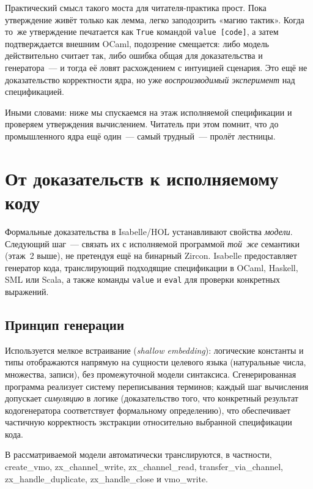 \documentclass[11pt,a4paper]{article}
\newcommand{\isabel}[1]{{\isabelleit #1}}
\newcommand{\lemmaname}[1]{\isabel{#1}}
\begin{document}
Практический смысл такого моста для читателя-практика прост. Пока
утверждение живёт только как лемма, легко заподозрить «магию тактик».
Когда то~же утверждение печатается как \texttt{True} командой
\texttt{value~[code]}, а затем подтверждается внешним OCaml, подозрение
смещается: либо модель действительно считает так, либо ошибка общая для
доказательства и генератора~--- и тогда её ловят расхождением с
интуицией сценария. Это ещё не доказательство корректности ядра, но уже
\emph{воспроизводимый эксперимент} над спецификацией.

Иными словами: ниже мы спускаемся на этаж исполняемой спецификации и
проверяем утверждения вычислением. Читатель при этом помнит, что до
промышленного ядра ещё один~--- самый трудный~--- пролёт лестницы.

\section{От доказательств к исполняемому коду}

Формальные доказательства в Isabelle/HOL устанавливают свойства
\emph{модели}. Следующий шаг~--- связать их с исполняемой программой
\emph{той~же} семантики (этаж~2 выше), не претендуя ещё на бинарный
Zircon. Isabelle предоставляет генератор кода, транслирующий подходящие
спецификации в OCaml, Haskell, SML или Scala, а также команды
\texttt{value} и \texttt{eval} для проверки конкретных выражений.

\subsection{Принцип генерации}

Используется мелкое встраивание (\emph{shallow embedding}): логические
константы и типы отображаются напрямую на сущности целевого языка
(натуральные числа, множества, записи), без промежуточной модели
синтаксиса. Сгенерированная программа реализует систему переписывания
терминов; каждый шаг вычисления допускает \emph{симуляцию} в логике
(доказательство того, что конкретный результат кодогенератора
соответствует формальному определению), что обеспечивает частичную
корректность экстракции относительно выбранной спецификации кода.

В рассматриваемой модели автоматически транслируются, в частности,
\lemmaname{create\_vmo}, \lemmaname{zx\_channel\_write},
\lemmaname{zx\_channel\_read}, \lemmaname{transfer\_via\_channel},
\lemmaname{zx\_handle\_duplicate}, \lemmaname{zx\_handle\_close} и
\lemmaname{vmo\_write}.
\end{document}
